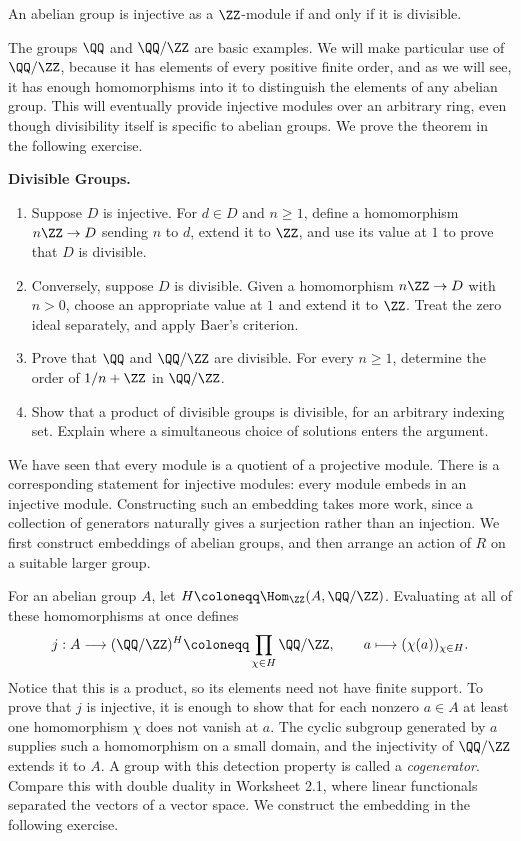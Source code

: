 \documentclass[12pt,reqno]{amsart}
\begin{document}
\begin{theorem}
An abelian group is injective as a $\ZZ$-module if and only if it is divisible.
\end{theorem}

The groups $\QQ$ and $\QQ/\ZZ$ are basic examples. We will make particular use of $\QQ/\ZZ$, because it has elements of every positive finite order, and as we will see, it has enough homomorphisms into it to distinguish the elements of any abelian group. This will eventually provide injective modules over an arbitrary ring, even though divisibility itself is specific to abelian groups. We prove the theorem in the following exercise.

\hrulefill

\begin{problems}
\item\label{h:divisible} \textbf{Divisible Groups.}
\begin{enumerate}
\item Suppose $D$ is injective. For $d\in D$ and $n\geq1$, define a homomorphism $n\ZZ\to D$ sending $n$ to $d$, extend it to $\ZZ$, and use its value at $1$ to prove that $D$ is divisible.
\item Conversely, suppose $D$ is divisible. Given a homomorphism $n\ZZ\to D$ with $n>0$, choose an appropriate value at $1$ and extend it to $\ZZ$. Treat the zero ideal separately, and apply Baer's criterion.
\item Prove that $\QQ$ and $\QQ/\ZZ$ are divisible. For every $n\geq1$, determine the order of $1/n+\ZZ$ in $\QQ/\ZZ$.
\item Show that a product of divisible groups is divisible, for an arbitrary indexing set. Explain where a simultaneous choice of solutions enters the argument.
\end{enumerate}
\end{problems}

\hrulefill

We have seen that every module is a quotient of a projective module. There is a corresponding statement for injective modules: every module embeds in an injective module. Constructing such an embedding takes more work, since a collection of generators naturally gives a surjection rather than an injection. We first construct embeddings of abelian groups, and then arrange an action of $R$ on a suitable larger group.

For an abelian group $A$, let $H\coloneqq\Hom_{\ZZ}(A,\QQ/\ZZ)$. Evaluating at all of these homomorphisms at once defines
\[
j:A\longrightarrow(\QQ/\ZZ)^H\coloneqq\prod_{\chi\in H}\QQ/\ZZ,\qquad a\longmapsto(\chi(a))_{\chi\in H}.
\]
Notice that this is a product, so its elements need not have finite support. To prove that $j$ is injective, it is enough to show that for each nonzero $a\in A$ at least one homomorphism $\chi$ does not vanish at $a$. The cyclic subgroup generated by $a$ supplies such a homomorphism on a small domain, and the injectivity of $\QQ/\ZZ$ extends it to $A$. A group with this detection property is called a \emph{cogenerator}. Compare this with double duality in Worksheet 2.1, where linear functionals separated the vectors of a vector space. We construct the embedding in the following exercise.
\end{document}
